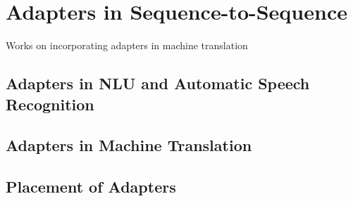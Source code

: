 \section{Adapters in Sequence-to-Sequence}
Works on incorporating adapters in machine translation
\subsection{Adapters in NLU and Automatic Speech Recognition}
\subsection{Adapters in Machine Translation}
\subsection{Placement of Adapters}
